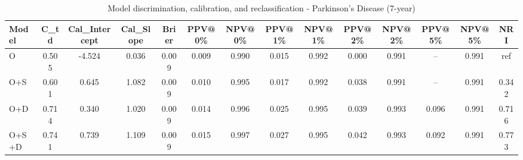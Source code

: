 \begin{table}[htbp]
\centering
\small
\caption{Model discrimination, calibration, and reclassification - Parkinson's Disease (7-year)}
\label{tab:perf_pd_7y}
\begin{tabular}{lccccccccccccc}
\toprule
Model & C\_td & Cal\_Intercept & Cal\_Slope & Brier & PPV@0\% & NPV@0\% & PPV@1\% & NPV@1\% & PPV@2\% & NPV@2\% & PPV@5\% & NPV@5\% & NRI \\
\midrule
O & 0.505 & -4.524 & 0.036 & 0.009 & 0.009 & 0.990 & 0.015 & 0.992 & 0.000 & 0.991 & -- & 0.991 & ref \\
O+S & 0.601 & 0.645 & 1.082 & 0.009 & 0.010 & 0.995 & 0.017 & 0.992 & 0.038 & 0.991 & -- & 0.991 & 0.342 \\
O+D & 0.714 & 0.340 & 1.020 & 0.009 & 0.014 & 0.996 & 0.025 & 0.995 & 0.039 & 0.993 & 0.096 & 0.991 & 0.716 \\
O+S+D & 0.741 & 0.739 & 1.109 & 0.009 & 0.015 & 0.997 & 0.027 & 0.995 & 0.042 & 0.993 & 0.092 & 0.991 & 0.773 \\
\bottomrule
\end{tabular}
\end{table}